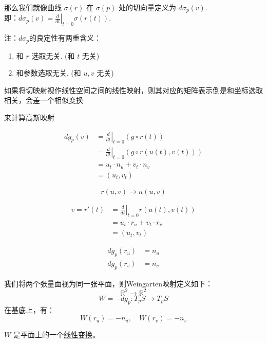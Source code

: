 \documentclass[lang=cn,10pt,thmcnt=section]{elegantbook}
\begin{document}
$\text{那么我们就像曲线 } \sigma(r) \text{ 在 } \sigma(p) \text{ 处的切向量定义为 } d\sigma_p(v).$
$
\text{即：} d\sigma_p(v) = \left.\frac{d}{dt}\right|_{t=0} \sigma(r(t)).$

$\text{注：} d\sigma_p \text{的良定性有两重含义：}$
\begin{enumerate}
    \item 和 $r$ 选取无关. (和 $t$ 无关)
    \item 和参数选取无关. (和 $u,v$ 无关)
\end{enumerate}
\begin{remark}
    如果将切映射视作线性空间之间的线性映射，则其对应的矩阵表示倒是和坐标选取相关，会差一个相似变换
\end{remark}
来计算高斯映射

\[
\begin{aligned}
dg_p(v) &= \left. \frac{d}{dt} \right|_{t=0} (g \circ r(t)) \\
&= \left. \frac{d}{dt} \right|_{t=0} (g \circ r(u(t), v(t))) \\
&= u_t \cdot n_u + v_t \cdot n_v \\
&= (u_t, v_t)
\end{aligned}
\]


\[
r(u,v) \longrightarrow n(u,v)
\]


\[
\begin{aligned}
v = r'(t) &= \left. \frac{d}{dt} \right|_{t=0} r(u(t), v(t)) \\
&= u_t \cdot r_u + v_t \cdot r_v \\
&= (u_t, v_t)
\end{aligned}
\]


\[
\begin{aligned}
dg_p(r_u) &= n_u \\
dg_p(r_v) &= n_v
\end{aligned}
\]
\begin{definition}[Weingarten映射]
    我们将两个张量面视为同一张平面，则Weingarten映射定义如下：
\[
\mathbb{R}^2 \to \mathbb{R}^2
\]
\[
W = -dg_p : T_pS \to T_pS
\]
在基底上，有：
\[
W(r_u) = -n_u, \quad W(r_v) = -n_v
\]

$W$ 是平面上的一个\underline{线性变换}。
\end{definition}
\end{document}
